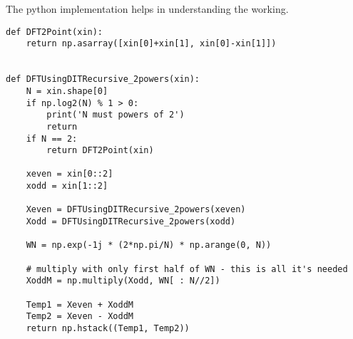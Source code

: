 \documentclass{article}
\begin{document}
The python implementation helps in understanding the working.
\begin{verbatim}
def DFT2Point(xin):
    return np.asarray([xin[0]+xin[1], xin[0]-xin[1]])


def DFTUsingDITRecursive_2powers(xin):
    N = xin.shape[0]
    if np.log2(N) % 1 > 0:
        print('N must powers of 2')
        return
    if N == 2:
        return DFT2Point(xin)
    
    xeven = xin[0::2]
    xodd = xin[1::2]

    Xeven = DFTUsingDITRecursive_2powers(xeven)
    Xodd = DFTUsingDITRecursive_2powers(xodd)

    WN = np.exp(-1j * (2*np.pi/N) * np.arange(0, N))

    # multiply with only first half of WN - this is all it's needed
    XoddM = np.multiply(Xodd, WN[ : N//2])

    Temp1 = Xeven + XoddM
    Temp2 = Xeven - XoddM
    return np.hstack((Temp1, Temp2))
\end{verbatim}
\end{document}
